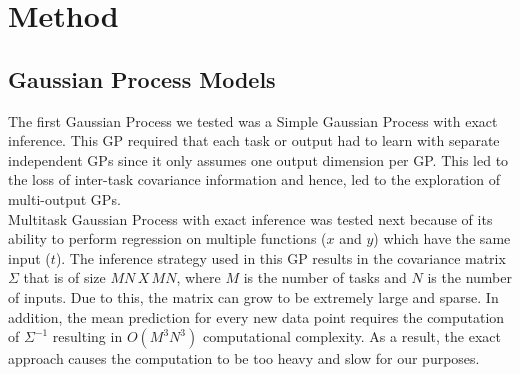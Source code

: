 \section{Method}

\subsection{Gaussian Process Models}
The first Gaussian Process we tested was a Simple Gaussian Process with exact inference. This GP required that each task or output had to learn with separate independent GPs since it only assumes one output dimension per GP. This led to the loss of inter-task covariance information and hence, led to the exploration of multi-output GPs.\\
    
Multitask Gaussian Process with exact inference was tested next because of its ability to perform regression on multiple functions ($x$ and $y$) which have the same input ($t$). The inference strategy used in this GP results in the covariance matrix $\Sigma$ that is of size $MN\, X\, MN$, where $M$ is the number of tasks and $N$ is the number of inputs. Due to this, the matrix can grow to be extremely large and sparse. In addition, the mean prediction for every new data point requires the computation of $\Sigma^{-1}$ resulting in $O(M^3N^3)$ computational complexity. As a result, the exact approach causes the computation to be too heavy and slow for our purposes. \\
    
